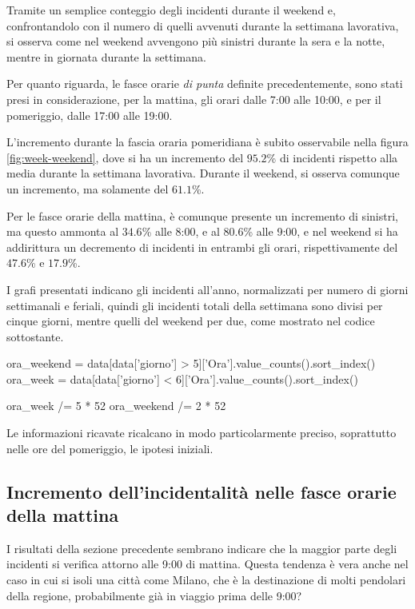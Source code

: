 \documentclass[a4paper,12pt]{report}
\newcommand{\quotestyle}[1]{\textit{#1}}
\begin{document}
Tramite un semplice conteggio degli incidenti durante il weekend e, 
confrontandolo con il numero di quelli avvenuti durante la 
settimana lavorativa, si osserva come nel weekend avvengono più sinistri 
durante la sera e la notte, mentre in giornata durante la settimana.

Per quanto riguarda, le fasce orarie \quotestyle{di punta} definite precedentemente, 
sono stati presi in considerazione, per la mattina, gli orari dalle 7:00 alle 10:00, 
e per il pomeriggio, dalle 17:00 alle 19:00.

L'incremento durante la fascia oraria pomeridiana è subito osservabile nella figura 
\ref{fig:week-weekend}, dove si ha un incremento del $95.2$\% di incidenti rispetto 
alla media durante la settimana lavorativa. 
Durante il weekend, si osserva comunque un incremento, ma solamente del $61.1$\%.

Per le fasce orarie della mattina, è comunque presente un incremento di sinistri, ma questo 
ammonta al $34.6$\% alle 8:00, e al $80.6$\% alle 9:00, e nel weekend si ha addirittura un 
decremento di incidenti in entrambi gli orari, rispettivamente del $47.6$\% e $17.9$\%.

I grafi presentati indicano gli incidenti all'anno, normalizzati per numero di 
giorni settimanali e feriali, quindi gli incidenti totali della settimana sono divisi 
per cinque giorni, mentre quelli del weekend per due, come mostrato nel codice sottostante.

\begin{code}[language=Python]
ora_weekend = data[data['giorno'] > 5]['Ora'].value_counts().sort_index()
ora_week = data[data['giorno'] < 6]['Ora'].value_counts().sort_index()

ora_week /= 5 * 52
ora_weekend /= 2 * 52
\end{code}

Le informazioni ricavate ricalcano in modo particolarmente preciso, soprattutto nelle ore del 
pomeriggio, le ipotesi iniziali.

\subsection{Incremento dell'incidentalità nelle fasce orarie della mattina}

I risultati della sezione precedente sembrano indicare che la maggior parte degli 
incidenti si verifica attorno alle 9:00 di mattina. 
Questa tendenza è vera anche nel caso in cui si isoli una città come Milano, 
che è la destinazione di molti pendolari della regione, probabilmente 
già in viaggio prima delle 9:00?
\end{document}
